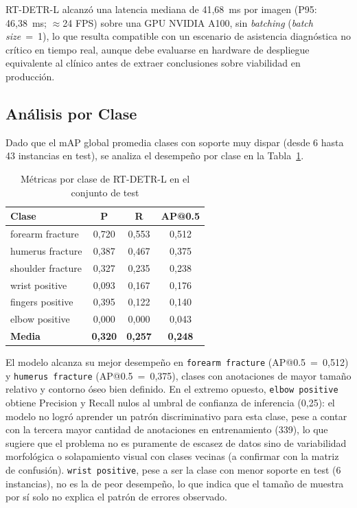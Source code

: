 \documentclass[conference]{IEEEtran}
\begin{document}
RT-DETR-L alcanzó una latencia mediana de 41{,}68~ms por imagen (P95:
46{,}38~ms; $\approx$24 FPS) sobre una GPU NVIDIA A100, sin \textit{batching}
(\textit{batch size}~=~1), lo que resulta compatible con un escenario de
asistencia diagnóstica no crítico en tiempo real, aunque debe evaluarse en
hardware de despliegue equivalente al clínico antes de extraer conclusiones
sobre viabilidad en producción.

\subsection{Análisis por Clase}

Dado que el mAP global promedia clases con soporte muy dispar (desde 6 hasta 43
instancias en test), se analiza el desempeño por clase en la
Tabla~\ref{tab:per-class}.

\begin{table}[htbp]
\caption{Métricas por clase de RT-DETR-L en el conjunto de test}
\label{tab:per-class}
\begin{center}
\begin{tabular}{lccc}
\toprule
\textbf{Clase} & \textbf{P} & \textbf{R} & \textbf{AP@0.5} \\
\midrule
forearm fracture  & 0{,}720 & 0{,}553 & 0{,}512 \\
humerus fracture  & 0{,}387 & 0{,}467 & 0{,}375 \\
shoulder fracture & 0{,}327 & 0{,}235 & 0{,}238 \\
wrist positive    & 0{,}093 & 0{,}167 & 0{,}176 \\
fingers positive  & 0{,}395 & 0{,}122 & 0{,}140 \\
elbow positive    & 0{,}000 & 0{,}000 & 0{,}043 \\
\midrule
\textbf{Media}    & \textbf{0{,}320} & \textbf{0{,}257} & \textbf{0{,}248} \\
\bottomrule
\end{tabular}
\end{center}
\end{table}

El modelo alcanza su mejor desempeño en \texttt{forearm fracture}
(AP@0.5~=~0,512) y \texttt{humerus fracture} (AP@0.5~=~0,375), clases con
anotaciones de mayor tamaño relativo y contorno óseo bien definido. En el
extremo opuesto, \texttt{elbow positive} obtiene Precision y Recall nulos al
umbral de confianza de inferencia (0,25): el modelo no logró aprender un
patrón discriminativo para esta clase, pese a contar con la tercera mayor
cantidad de anotaciones en entrenamiento (339), lo que sugiere que el
problema no es puramente de escasez de datos sino de variabilidad
morfológica o solapamiento visual con clases vecinas (a confirmar con la
matriz de confusión). \texttt{wrist positive}, pese a ser la clase con menor
soporte en test (6 instancias), no es la de peor desempeño, lo que indica que
el tamaño de muestra por sí solo no explica el patrón de errores observado.
\end{document}
